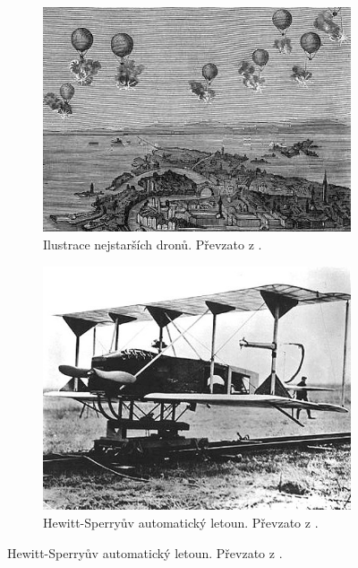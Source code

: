 \begin{figure}[ht]
    \centering
    \begin{subfigure}[t]{0.27\linewidth}
        \centering
        \includegraphics[width=\linewidth]{obrazky-figures/drony/history-of-drones-balloons.jpg}
        \caption{Ilustrace nejstarších dronů. Převzato z \cite{DroneHistory}.}
        \label{pic:balon}
    \end{subfigure}
    \hfill
    \begin{subfigure}[t]{0.26\linewidth}
        \centering
        \includegraphics[width=\linewidth]{obrazky-figures/drony/hewitt-sperry_automatic_airplane_1918.jpg}
        \caption{Hewitt-Sperryův automatický letoun. Převzato z \cite{DroneHistory2WWX}.}

\end{subfigure}
\end{figure}
